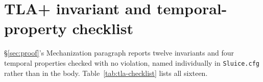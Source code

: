 \documentclass[conference,compsoc]{IEEEtran}
\begin{document}
\begin{table}[h]
\centering
\small
\caption{RQ4 latency in ms under \texttt{DurableStore}'s actual
\texttt{DELETE} production-portability journal mode. Compare directly
against the matching \texttt{WAL} row in Table~\ref{tab:rq4}.}
\label{tab:rq4-delete}
\end{table}

\section{TLA+ invariant and temporal-property checklist}
\label{app:tla-checklist}
\S\ref{sec:proof}'s Mechanization paragraph reports twelve invariants
and four temporal properties checked with no violation, named
individually in \texttt{Sluice.cfg} rather than in the body.
Table~\ref{tab:tla-checklist} lists all sixteen.
\end{document}
